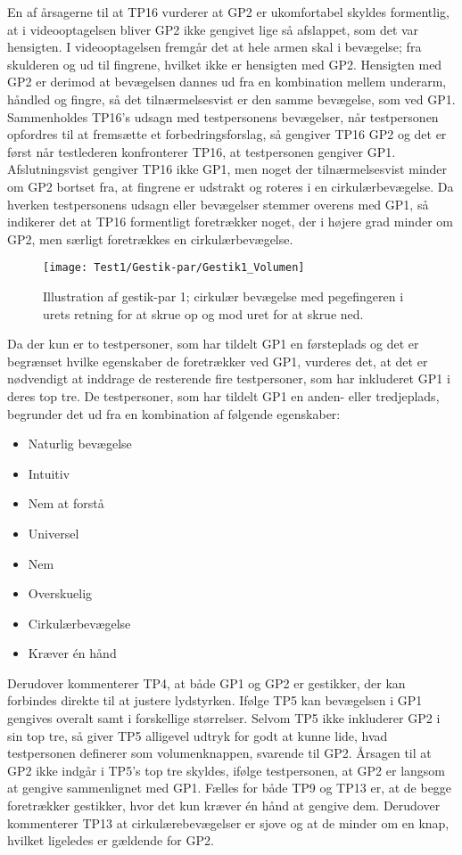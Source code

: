 En af årsagerne til at TP16 vurderer at GP2 er ukomfortabel skyldes formentlig, at i videooptagelsen bliver GP2 ikke gengivet lige så afslappet, som det var hensigten. I videooptagelsen fremgår det at hele armen skal i bevægelse; fra skulderen og ud til fingrene, hvilket ikke er hensigten med GP2. Hensigten med GP2 er derimod at bevægelsen dannes ud fra en kombination mellem underarm, håndled og fingre, så det tilnærmelsesvist er den samme bevægelse, som ved GP1. Sammenholdes TP16's udsagn med testpersonens bevægelser, når testpersonen opfordres til at fremsætte et forbedringsforslag, så gengiver TP16 GP2 og det er først når testlederen konfronterer TP16, at testpersonen gengiver GP1. Afslutningsvist gengiver TP16 ikke GP1, men noget der tilnærmelsesvist minder om GP2 bortset fra, at fingrene er udstrakt og roteres i en cirkulærbevægelse. Da hverken testpersonens udsagn eller bevægelser stemmer overens med GP1, så indikerer det at TP16 formentligt foretrækker noget, der i højere grad minder om GP2, men særligt foretrækkes en cirkulærbevægelse.
%
\begin{figure}[H]
	\centering
	\texttt{[image: Test1/Gestik-par/Gestik1\_Volumen]}
	\caption{Illustration af gestik-par 1; cirkulær bevægelse med pegefingeren i urets retning for at skrue op og mod uret for at skrue ned.}
	\label{fig:GestikPar1Volumen}
\end{figure}
\noindent
%
Da der kun er to testpersoner, som har tildelt GP1 en førsteplads og det er begrænset hvilke egenskaber de foretrækker ved GP1, vurderes det, at det er nødvendigt at inddrage de resterende fire testpersoner, som har inkluderet GP1 i deres top tre. De testpersoner, som har tildelt GP1 en anden- eller tredjeplads, begrunder det ud fra en kombination af følgende egenskaber: 
%
\begin{multicols}{3}
    \begin{itemize}
        \item Naturlig bevægelse
        \item Intuitiv 
        \item Nem at forstå
        \item Universel
        \item Nem
        \item Overskuelig
        \item Cirkulærbevægelse
        \item Kræver én hånd
\end{itemize}
\end{multicols}
\noindent
%
Derudover kommenterer TP4, at både GP1 og GP2 er gestikker, der kan forbindes direkte til at justere lydstyrken. Ifølge TP5 kan bevægelsen i GP1 gengives overalt samt i forskellige størrelser. Selvom TP5 ikke inkluderer GP2 i sin top tre, så giver TP5 alligevel udtryk for godt at kunne lide, hvad testpersonen definerer som volumenknappen, svarende til GP2. Årsagen til at GP2 ikke indgår i TP5's top tre skyldes, ifølge testpersonen, at GP2 er langsom at gengive sammenlignet med GP1. Fælles for både TP9 og TP13 er, at de begge foretrækker gestikker, hvor det kun kræver én hånd at gengive dem. Derudover kommenterer TP13 at cirkulærebevægelser er sjove og at de minder om en knap, hvilket ligeledes er gældende for GP2.      
%
